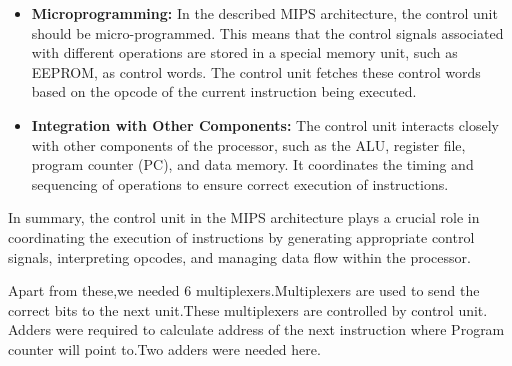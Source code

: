 \documentclass{article}
\begin{document}
\begin{enumerate}
\begin{itemize}
				\item \textbf{Microprogramming:} In the described MIPS architecture, the control unit should be micro-programmed. This means that the control signals associated with different operations are stored in a special memory unit, such as EEPROM, as control words. The control unit fetches these control words based on the opcode of the current instruction being executed.
				
				\item \textbf{Integration with Other Components:} The control unit interacts closely with other components of the processor, such as the ALU, register file, program counter (PC), and data memory. It coordinates the timing and sequencing of operations to ensure correct execution of instructions.
			\end{itemize}
			
			In summary, the control unit in the MIPS architecture plays a crucial role in coordinating the execution of instructions by generating appropriate control signals, interpreting opcodes, and managing data flow within the processor.
			
		\end{enumerate}
		
		Apart from these,we needed 6 multiplexers.Multiplexers are used to send the correct bits to the next unit.These multiplexers are controlled by control unit.\\
		
		Adders were required to calculate address of the next instruction where Program counter will point to.Two adders were needed here.
		
		
		
		
		\newpage
		
		
		
		
\end{document}
